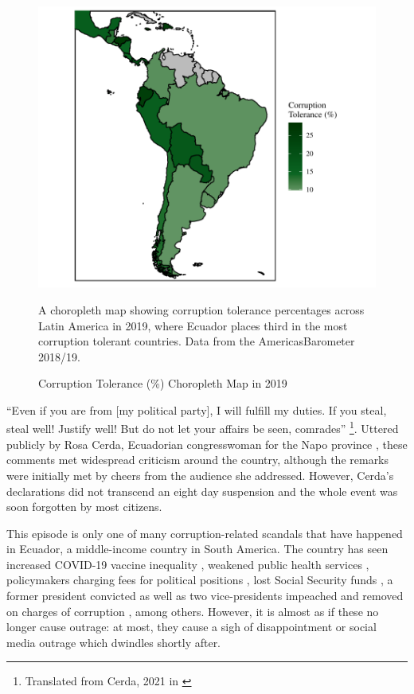 \documentclass[12pt,a4]{article}\usepackage[]{graphicx}\usepackage[]{xcolor}
\begin{document}
\begin{figure}[htbp!]
    \begin{center}
    \includegraphics[scale = 0.6]{images/ctol_map.pdf}
    \end{center}
    \caption{Corruption Tolerance (\%) Choropleth Map in 2019}
    \label{fig:ctolmap}
A choropleth map showing corruption tolerance percentages across Latin America in 2019, where Ecuador places third in the most corruption tolerant countries. Data from the \textregistered AmericasBarometer 2018/19. 
\end{figure}

\enquote{Even if you are from [my political party], I will fulfill my duties. If you steal, steal well!  Justify well! But do not let your affairs be seen, comrades} \footnote{Translated from Cerda, 2021 in \cite[para. 2]{PlanV.2021}}. Uttered publicly by Rosa Cerda, Ecuadorian congresswoman for the Napo province \parencite{Castro.2021}, these comments met widespread criticism around the country, although the remarks were initially met by cheers from the audience she addressed. However, Cerda's declarations did not transcend an eight day suspension \parencite{Ordonez.2021} and the whole event was soon forgotten by most citizens. 

This episode is only one of many corruption-related scandals that have happened in Ecuador, a middle-income country in South America. The country has seen increased COVID-19 vaccine inequality \parencite{Taj.2021}, weakened public health services \parencite{Celi.2020}, policymakers charging fees for political positions \parencite{Espinosa.2021}, lost Social Security funds \parencite{Pesantes.9152020}, a former president convicted \parencite{Valencia.2020} as well as two vice-presidents impeached and removed on charges of corruption \parencite{Cabrera.2020}, among others. However, it is almost as if these no longer cause outrage: at most, they cause a sigh of disappointment or social media outrage which dwindles shortly after.
\end{document}
